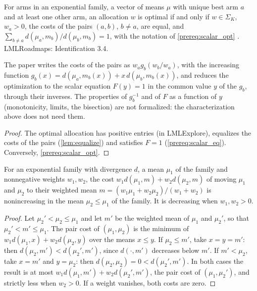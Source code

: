 \begin{theorem}
  \label{prereq:scalar}
  \leanok
  For arms in an exponential family, a vector of means $\mu$ with unique best arm $a$ and at
  least one other arm, an allocation $w$ is optimal if and only if $w \in \Sigma_K$, $w_a > 0$,
  the costs of the pairs $(a, b)$, $b \ne a$, are equal, and
  $\sum_{b \ne a} d(\mu_a, m_b) / d(\mu_b, m_b) = 1$, with the notation of
  \cref{prereq:scalar_opt} \cite[Theorem 5]{GK16}. LMLRoadmaps: Identification 3.4.

  The paper writes the costs of the pairs as $w_a g_b(w_b / w_a)$, with the increasing function
  $g_b(x) = d(\mu_a, m_b(x)) + x\, d(\mu_b, m_b(x))$, and reduces the optimization to the scalar
  equation $F(y) = 1$ in the common value $y$ of the $g_b$, through their inverses. The
  properties of $g_b^{-1}$ and of $F$ as a function of $y$ (monotonicity, limits, the bisection)
  are not formalized: the characterization above does not need them.
\end{theorem}

\begin{proof}
  \leanok
  The optimal allocation has positive entries (in LMLExplore), equalizes the costs of the pairs
  (\cref{lem:equalize}) and satisfies $F = 1$ (\cref{prereq:scalar_eq}). Conversely,
  \cref{prereq:scalar_opt}.
\end{proof}

\begin{lemma}
  \label{prereq:pair_cost_anti}
  \leanok
  For an exponential family with divergence $d$, a mean $\mu_1$ of the family and nonnegative
  weights $w_1, w_2$, the cost $w_1 d(\mu_1, m) + w_2 d(\mu_2, m)$ of moving $\mu_1$ and $\mu_2$ to
  their weighted mean $m = (w_1\mu_1 + w_2\mu_2)/(w_1 + w_2)$ is nonincreasing in the mean
  $\mu_2 \le \mu_1$ of the family. It is decreasing when $w_1, w_2 > 0$.
\end{lemma}

\begin{proof}
  \leanok
  Let $\mu_2' < \mu_2 \le \mu_1$ and let $m'$ be the weighted mean of $\mu_1$ and $\mu_2'$, so that
  $\mu_2' < m' \le \mu_1$. The pair cost of $(\mu_1, \mu_2)$ is the minimum of
  $w_1 d(\mu_1, x) + w_2 d(\mu_2, y)$ over the means $x \le y$. If $\mu_2 \le m'$, take
  $x = y = m'$: then $d(\mu_2, m') < d(\mu_2', m')$, since $d(\cdot, m')$ decreases below $m'$. If
  $m' < \mu_2$, take $x = m'$ and $y = \mu_2$: then $d(\mu_2, \mu_2) = 0 < d(\mu_2', m')$. In both
  cases the result is at most $w_1 d(\mu_1, m') + w_2 d(\mu_2', m')$, the pair cost of
  $(\mu_1, \mu_2')$, and strictly less when $w_2 > 0$. If a weight vanishes, both costs are zero.
\end{proof}

